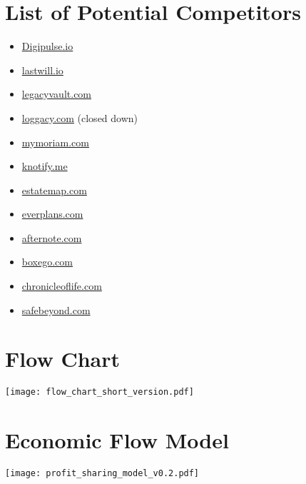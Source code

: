 \appendix

\section{List of Potential Competitors} %
\label{sec:list_of_potential_competitors}

\begin{itemize}
	\item \url{Digipulse.io}
	\item \url{lastwill.io}
	\item \url{legacyvault.com}
	\item \url{loggacy.com} (closed down)
	\item \url{mymoriam.com}
	\item \url{knotify.me}
	\item \url{estatemap.com}
	\item \url{everplans.com}
	\item \url{afternote.com}
	\item \url{boxego.com}
	\item \url{chronicleoflife.com}
	\item \url{safebeyond.com}
\end{itemize}

\section{Flow Chart} %
\label{sec:flow_chart}

\texttt{[image: flow\_chart\_short\_version.pdf]}

\section{Economic Flow Model} %
\label{sec:economic_flow_model}

\texttt{[image: profit\_sharing\_model\_v0.2.pdf]}

